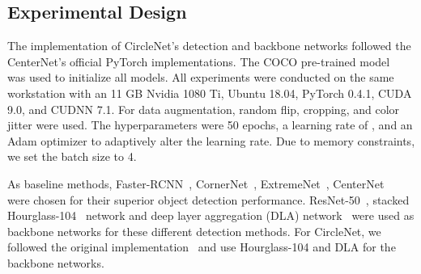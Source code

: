 \documentclass[journal]{IEEEtran}
\begin{document}
\subsection{Experimental Design}
The implementation of CircleNet's detection and backbone networks followed the CenterNet's official PyTorch implementations. The COCO pre-trained model~\cite{lin2014microsoft} was used to initialize all models. All experiments were conducted on the same workstation with an 11 GB Nvidia 1080 Ti, Ubuntu 18.04, PyTorch 0.4.1, CUDA 9.0, and CUDNN 7.1. For data augmentation, random flip, cropping, and color jitter were used. The hyperparameters were 50 epochs, a learning rate of , and an Adam optimizer to adaptively alter the learning rate. Due to memory constraints, we set the batch size to 4.

As baseline methods, Faster-RCNN~\cite{ren2015faster}, CornerNet~\cite{law2018cornernet}, ExtremeNet~\cite{zhou2019bottom}, CenterNet~\cite{zhou2019objects} were chosen for their superior object detection performance. ResNet-50~\cite{he2016deep}, stacked Hourglass-104~\cite{newell2016stacked} network and deep layer aggregation (DLA) network~\cite{yu2018deep} were used as backbone networks for these different detection methods. For CircleNet, we followed the original implementation~\cite{yang2020circlenet} and use Hourglass-104 and DLA for the backbone networks. 
\end{document}
